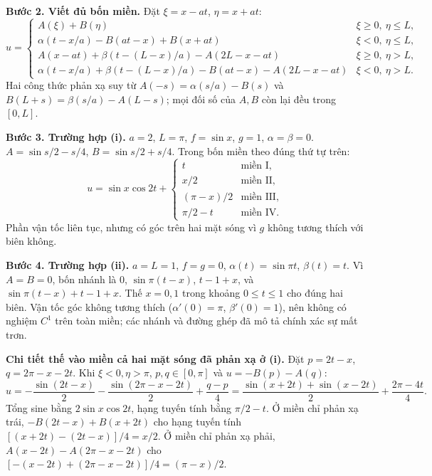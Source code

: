 \documentclass[10pt,a4paper]{article}
\begin{document}
\textbf{Bước 2. Viết đủ bốn miền.} Đặt $\xi=x-at$, $\eta=x+at$:
\[u=\begin{cases}
A(\xi)+B(\eta)&\xi\ge0,\ \eta\le L,\\
\alpha(t-x/a)-B(at-x)+B(x+at)&\xi<0,\ \eta\le L,\\
A(x-at)+\beta(t-(L-x)/a)-A(2L-x-at)&\xi\ge0,\ \eta>L,\\
\alpha(t-x/a)+\beta(t-(L-x)/a)-B(at-x)-A(2L-x-at)&\xi<0,\ \eta>L.
\end{cases}\]
Hai công thức phản xạ suy từ $A(-s)=\alpha(s/a)-B(s)$ và $B(L+s)=\beta(s/a)-A(L-s)$; mọi đối số của $A,B$ còn lại đều trong $[0,L]$.

\textbf{Bước 3. Trường hợp (i).} $a=2$, $L=\pi$, $f=\sin x$, $g=1$, $\alpha=\beta=0$. $A=\sin s/2-s/4$, $B=\sin s/2+s/4$. Trong bốn miền theo đúng thứ tự trên:
\[u=\sin x\cos2t+\begin{cases}t&\text{miền I},\\x/2&\text{miền II},\\(\pi-x)/2&\text{miền III},\\\pi/2-t&\text{miền IV}.\end{cases}\]
Phần vận tốc liên tục, nhưng có góc trên hai mặt sóng vì $g$ không tương thích với biên không.

\textbf{Bước 4. Trường hợp (ii).} $a=L=1$, $f=g=0$, $\alpha(t)=\sin\pi t$, $\beta(t)=t$. Vì $A=B=0$, bốn nhánh là $0$, $\sin\pi(t-x)$, $t-1+x$, và $\sin\pi(t-x)+t-1+x$. Thế $x=0,1$ trong khoảng $0\le t\le1$ cho đúng hai biên. Vận tốc góc không tương thích ($\alpha'(0)=\pi$, $\beta'(0)=1$), nên không có nghiệm $C^1$ trên toàn miền; các nhánh và đường ghép đã mô tả chính xác sự mất trơn.

\textbf{Chi tiết thế vào miền cả hai mặt sóng đã phản xạ ở (i).} Đặt $p=2t-x$, $q=2\pi-x-2t$. Khi $\xi<0,\eta>\pi$, $p,q\in[0,\pi]$ và $u=-B(p)-A(q)$:
\[u=-\frac{\sin(2t-x)}2-\frac{\sin(2\pi-x-2t)}2+\frac{q-p}{4}
=\frac{\sin(x+2t)+\sin(x-2t)}2+\frac{2\pi-4t}{4}.\]
Tổng sine bằng $2\sin x\cos2t$, hạng tuyến tính bằng $\pi/2-t$. Ở miền chỉ phản xạ trái, $-B(2t-x)+B(x+2t)$ cho hạng tuyến tính $[(x+2t)-(2t-x)]/4=x/2$. Ở miền chỉ phản xạ phải, $A(x-2t)-A(2\pi-x-2t)$ cho $[-(x-2t)+(2\pi-x-2t)]/4=(\pi-x)/2$.
\end{document}
